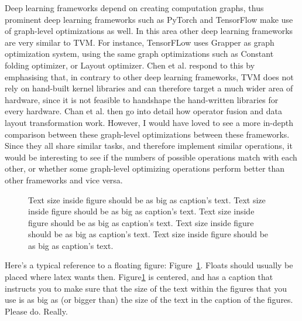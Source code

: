 Deep learning frameworks depend on creating computation graphs, thus prominent deep learning frameworks such as PyTorch and 
TensorFlow make use of graph-level optimizations as well. In this area other deep learning frameworks are very similar to TVM.
For instance, TensorFLow uses Grapper as graph optimization system, using the same graph optimizations such as Constant folding optimizer, or Layout optimizer.
Chen et al. respond to this by emphasising that, in contrary to other deep learning frameworks, TVM does not rely on hand-built kernel libraries and
can therefore target a much wider area of hardware, since it is not feasible to handshape the hand-written libraries for every hardware.
Chan et al. then go into detail how operator fusion and data layout transformation work. However, I would have loved 
to see a more in-depth comparison between these graph-level optimizations between these frameworks. Since they all share similar tasks, and 
therefore implement similar operations, it would be interesting to see if the numbers of possible operations match with each other, or whether 
some graph-level optimizing operations perform better than other frameworks and vice versa.
\begin{figure}
\begin{center}
\end{center}
\caption{\label{fig:vectors} Text size inside figure should be as big as
  caption's text. Text size inside figure should be as big as
  caption's text. Text size inside figure should be as big as
  caption's text. Text size inside figure should be as big as
  caption's text. Text size inside figure should be as big as
  caption's text. }
\end{figure}


Here's a typical reference to a floating figure:
Figure~\ref{fig:vectors}. Floats should usually be placed where latex
wants then. Figure\ref{fig:vectors} is centered, and has a caption
that instructs you to make sure that the size of the text within the
figures that you use is as big as (or bigger than) the size of the
text in the caption of the figures. Please do. Really.

